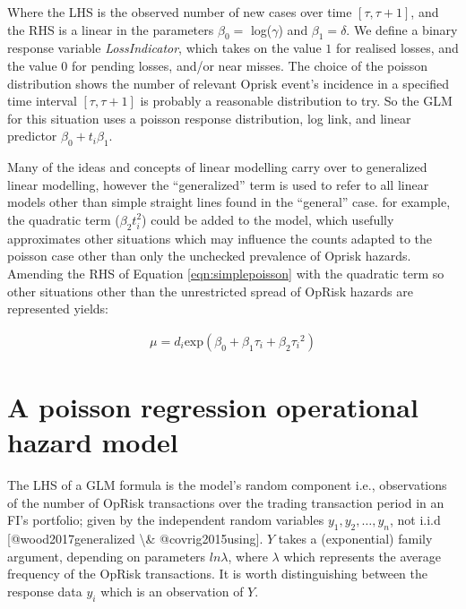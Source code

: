 \documentclass[]{article}
\begin{document}
Where the LHS is the observed number of new cases over time
\([\tau,\tau+1]\), and the RHS is a linear in the parameters
\(\beta_0 =\) \mbox{log}(\(\gamma\)) and \(\beta_1 = \delta\). We define
a binary response variable \emph{LossIndicator}, which takes on the
value \(1\) for realised losses, and the value \(0\) for pending losses,
and/or near misses. The choice of the poisson distribution shows the
number of relevant Oprisk event's incidence in a specified time interval
\([\tau,\tau+1]\) is probably a reasonable distribution to try. So the
GLM for this situation uses a poisson response distribution, log link,
and linear predictor \(\beta_0 + t_i\beta_1\).\medskip

Many of the ideas and concepts of linear modelling carry over to
generalized linear modelling, however the ``generalized'' term is used
to refer to all linear models other than simple straight lines found in
the ``general'' case. for example, the quadratic term (\(\beta_2t_i^2\))
could be added to the model, which usefully approximates other
situations which may influence the counts adapted to the poisson case
other than only the unchecked prevalence of Oprisk hazards. Amending the
RHS of Equation \ref{eqn:simplepoisson} with the quadratic term so other
situations other than the unrestricted spread of OpRisk hazards are
represented yields:

\singlespacing

\begin{eqnarray}\label{eqn:adaptedpoisson}
\mu = d_i\mbox{exp}(\beta_0 + \beta_1\tau_i + \beta_2{\tau_i}^2) 
\end{eqnarray} \doublespacing

\section{A poisson regression operational hazard model}
\label{sec:A poisson regression operational hazard model}

The LHS of a GLM formula is the model's random component i.e.,
observations of the number of OpRisk transactions over the trading
transaction period in an FI's portfolio; given by the independent random
variables \(y_1, y_2,\ldots, y_n\), not i.i.d {[}@wood2017generalized
\textbackslash{}\& @covrig2015using{]}. \(Y\) takes a (exponential)
family argument, depending on parameters \(ln\lambda\), where
\(\lambda\) which represents the average frequency of the OpRisk
transactions. It is worth distinguishing between the response data
\(y_i\) which is an observation of \(Y\).\medskip
\end{document}

